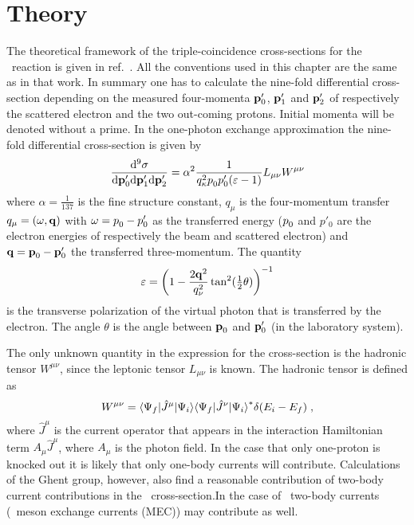 \section{Theory\label{sec:CROSStheory}}
The theoretical framework of the triple-coincidence cross-sections
for the \eepp\ reaction is given in ref.~\cite{GP91}. All the conventions
used in this chapter are the same as in that work. In summary one has to
calculate the nine-fold differential cross-section depending on the measured
four-momenta ${\bf p}'_0$, ${\bf p}'_1$ and ${\bf p}'_2$ of respectively the
scattered electron and the two out-coming protons. Initial momenta will be 
denoted without a prime. In the one-photon exchange approximation the 
nine-fold differential cross-section is given by
%
	\begin{equation}
		\frac{
			{\rm d}^9 \sigma
		}{
			{\rm d}\rvec{p}'_0
			{\rm d}\rvec{p}'_1
			{\rm d}\rvec{p}'_2
		}
	=
		\alpha^2
		\frac{1}{
			q_\kappa^2 p\phpr_0 p'_0 (\varepsilon - 1)
		}
		L_{\mu\nu} W^{\mu\nu}
	\label{eq:crosss}
	\end{equation}
%
where $\alpha=\frac{1}{137}$ is the fine structure constant, $q_\mu$ is the 
four-momentum transfer $q_\mu=( \omega, {\bf q} )$ with 
$\omega=p\phpr_0-p'_0$ as the
transferred energy ($p\phpr_0$ and $p'_0$ are the electron energies of 
respectively
the beam and scattered electron) and $\rvec{q}=\rvec{p}\phpr_0-\rvec{p}'_0$ the 
transferred three-momentum. The quantity
%
	\begin{equation}
		\varepsilon
	=
		\left(
		 1 - \frac{2{\bf q}^2}{q_\nu^2} \tan^2({\mbox{$\frac{1}{2}$}}\theta)
		\right)^{-1}
	\end{equation}
%
is the transverse polarization of the virtual photon that is  transferred by 
the electron.
The angle $\theta$ is the angle between $\rvec{p}\phpr_0$ and ${\bf p}'_0$ 
(in the
laboratory system).

The only unknown quantity in the expression for the cross-section is the 
hadronic
tensor $W^{\mu\nu}$, since the leptonic tensor $L_{\mu\nu}$ is known.
The hadronic tensor is defined as
%
	\begin{equation}
		W^{\mu\nu}
	=
		\ME< \Psi_f | \hat{J}^\mu | \Psi_i >
		\ME< \Psi_f | \hat{J}^\nu | \Psi_i >^\ast
		\delta( E_i - E_f )
	\label{eq:hadron}
	\;,
	\end{equation}
%
where $\hat{J}^\mu$ is the current operator that appears in the interaction 
Hamiltonian term $A_\mu\hat{J}^\mu$, where $A_\mu$ is the photon field. In the 
case that only one-proton is knocked out it is likely that only one-body 
currents will contribute. Calculations of the Ghent group\cite{Ry94}, 
however, also find
a reasonable contribution of two-body current contributions in the \eep\ 
cross-section.In the case of \eepp\ two-body currents (\eg\ meson exchange 
currents (MEC)) may contribute as well.

